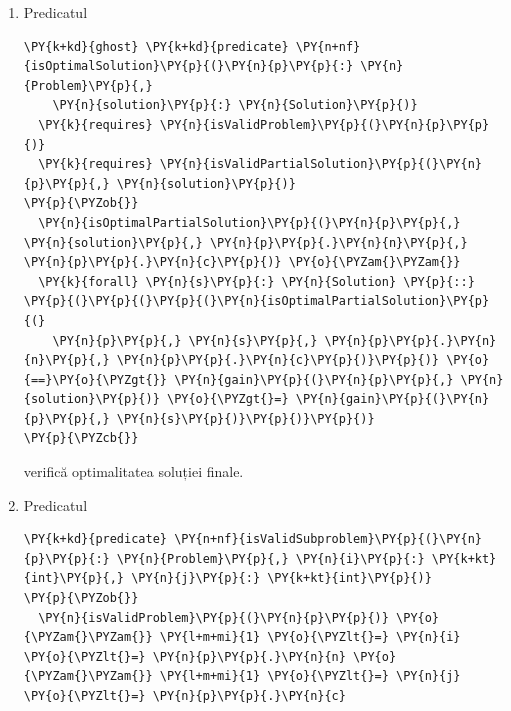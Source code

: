 \begin{sloppypar}
\begin{enumerate}
\begin{Verbatim}[commandchars=\\\{\}]
    \PY{o}{|}\PY{n}{s}\PY{o}{|} \PY{o}{==} \PY{o}{|}\PY{n}{solution}\PY{o}{|} \PY{o}{==}\PY{o}{\PYZgt{}} \PY{n}{gain}\PY{p}{(}\PY{n}{p}\PY{p}{,} \PY{n}{solution}\PY{p}{)} \PY{o}{\PYZgt{}=} \PY{n}{gain}\PY{p}{(}\PY{n}{p}\PY{p}{,} \PY{n}{s}\PY{p}{)}\PY{p}{)}
\PY{p}{\PYZcb{}}
\end{Verbatim}
    este folosit pentru verificarea optimalității unei subprobleme $(i, j)$, adică avem cel mai bun câștig care se poate obține pentru orice soluție validă cu elemente de 0 și 1 ale unei subprobleme cu $i$ obiecte și o capacitate $j$ a rucsacului.
    \item Predicatul 
\begin{Verbatim}[commandchars=\\\{\}]
\PY{k+kd}{ghost} \PY{k+kd}{predicate} \PY{n+nf}{isOptimalSolution}\PY{p}{(}\PY{n}{p}\PY{p}{:} \PY{n}{Problem}\PY{p}{,} 
    \PY{n}{solution}\PY{p}{:} \PY{n}{Solution}\PY{p}{)}
  \PY{k}{requires} \PY{n}{isValidProblem}\PY{p}{(}\PY{n}{p}\PY{p}{)}
  \PY{k}{requires} \PY{n}{isValidPartialSolution}\PY{p}{(}\PY{n}{p}\PY{p}{,} \PY{n}{solution}\PY{p}{)}
\PY{p}{\PYZob{}}
  \PY{n}{isOptimalPartialSolution}\PY{p}{(}\PY{n}{p}\PY{p}{,} \PY{n}{solution}\PY{p}{,} \PY{n}{p}\PY{p}{.}\PY{n}{n}\PY{p}{,} \PY{n}{p}\PY{p}{.}\PY{n}{c}\PY{p}{)} \PY{o}{\PYZam{}\PYZam{}}
  \PY{k}{forall} \PY{n}{s}\PY{p}{:} \PY{n}{Solution} \PY{p}{::} \PY{p}{(}\PY{p}{(}\PY{p}{(}\PY{n}{isOptimalPartialSolution}\PY{p}{(}
    \PY{n}{p}\PY{p}{,} \PY{n}{s}\PY{p}{,} \PY{n}{p}\PY{p}{.}\PY{n}{n}\PY{p}{,} \PY{n}{p}\PY{p}{.}\PY{n}{c}\PY{p}{)}\PY{p}{)} \PY{o}{==}\PY{o}{\PYZgt{}} \PY{n}{gain}\PY{p}{(}\PY{n}{p}\PY{p}{,} \PY{n}{solution}\PY{p}{)} \PY{o}{\PYZgt{}=} \PY{n}{gain}\PY{p}{(}\PY{n}{p}\PY{p}{,} \PY{n}{s}\PY{p}{)}\PY{p}{)}\PY{p}{)}
\PY{p}{\PYZcb{}}
\end{Verbatim}
    verifică optimalitatea soluției finale.
    \item Predicatul 
    \begin{Verbatim}[commandchars=\\\{\}]
\PY{k+kd}{predicate} \PY{n+nf}{isValidSubproblem}\PY{p}{(}\PY{n}{p}\PY{p}{:} \PY{n}{Problem}\PY{p}{,} \PY{n}{i}\PY{p}{:} \PY{k+kt}{int}\PY{p}{,} \PY{n}{j}\PY{p}{:} \PY{k+kt}{int}\PY{p}{)}
\PY{p}{\PYZob{}}
  \PY{n}{isValidProblem}\PY{p}{(}\PY{n}{p}\PY{p}{)} \PY{o}{\PYZam{}\PYZam{}} \PY{l+m+mi}{1} \PY{o}{\PYZlt{}=} \PY{n}{i} \PY{o}{\PYZlt{}=} \PY{n}{p}\PY{p}{.}\PY{n}{n} \PY{o}{\PYZam{}\PYZam{}} \PY{l+m+mi}{1} \PY{o}{\PYZlt{}=} \PY{n}{j} \PY{o}{\PYZlt{}=} \PY{n}{p}\PY{p}{.}\PY{n}{c} 

\end{Verbatim}
\end{enumerate}
\end{sloppypar}
